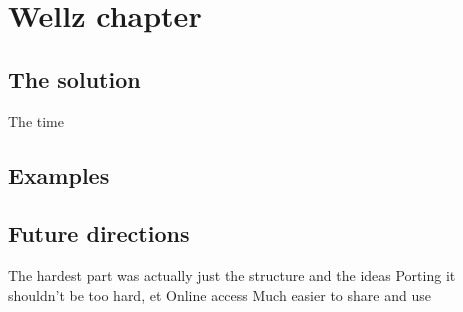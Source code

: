 \chapter{Wellz chapter}

\section{The solution}
The time

\section{Examples}


\section{Future directions}
The hardest part was actually just the structure and the ideas
Porting it shouldn't be too hard, et
Online access
Much easier to share and use

